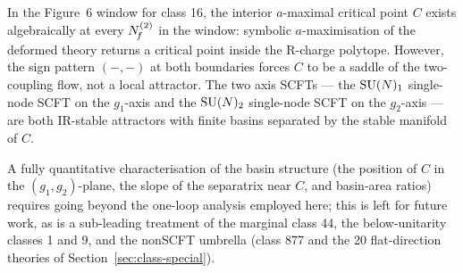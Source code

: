 In the Figure~6 window for class 16, the interior $a$-maximal
critical point $C$ exists algebraically at every $N_{\!f}^{(2)}$ in the
window: symbolic $a$-maximisation of the deformed theory returns a
critical point inside the R-charge polytope.  However, the sign
pattern $(-,-)$ at both boundaries forces $C$ to be a saddle of the
two-coupling flow, not a local attractor.  The two axis SCFTs — the
$\mathrm{SU}(N)_{1}$ single-node SCFT on the $g_{1}$-axis and the
$\mathrm{SU}(N)_{2}$ single-node SCFT on the $g_{2}$-axis — are both IR-stable
attractors with finite basins separated by the stable manifold of $C$.

A fully quantitative characterisation of the basin structure (the
position of $C$ in the $(g_{1},g_{2})$-plane, the slope of the
separatrix near $C$, and basin-area ratios) requires going beyond
the one-loop analysis employed here; this is left for future work,
as is a sub-leading treatment of the marginal class 44, the
below-unitarity classes 1 and 9, and the nonSCFT umbrella
(class 877 and the 20 flat-direction theories of
Section~\ref{sec:class-special}).

